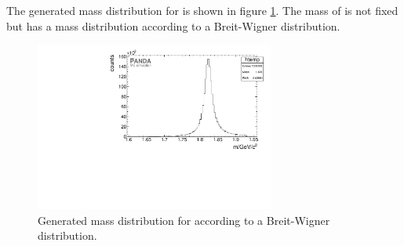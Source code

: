 The generated mass distribution for \excitedcascade is shown in figure \ref{fig:generated_mass}. The mass of \excitedcascade is not fixed but has a mass distribution according to a Breit-Wigner distribution.
\begin{figure}
	\centering
	\includegraphics[width=0.7\textwidth]{./plots/Xi1820/XiMinus1820_MC_mass.pdf}
	\caption{Generated mass distribution for \excitedcascade according to a Breit-Wigner distribution.}
	\label{fig:generated_mass}
\end{figure}


